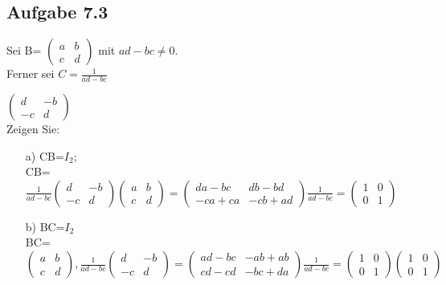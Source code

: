 \documentclass{standalone}
\begin{document}
\subsection{Aufgabe 7.3}


Sei B= $\begin{pmatrix}
	 a & b \\
	  c & d 
	\end{pmatrix}$ mit $ad-bc \neq 0$.\\
Ferner sei $C=\frac{1}{ad-bc}$

$\begin{pmatrix}
	d &-b \\
	-c & d 
\end{pmatrix}$\\ 
 Zeigen Sie: \\
\begin{itemize}
	
	\item[a)]
   CB=$I_2$;\\
   CB=$\frac{1}{ad-bc}
	\begin{pmatrix}
		d & -b \\
		-c & d 
	\end{pmatrix}
	\begin{pmatrix}
		a & b \\
		c & d 
	\end{pmatrix}=
	\begin{pmatrix}
		da-bc & db-bd \\
		-ca+ca & -cb+ad 
	\end{pmatrix}
	\frac{1}{ad-bc}=
	\begin{pmatrix}
		1 & 0 \\
		0 & 1 
	\end{pmatrix}$
	
	\item[b)]
   BC=$I_2$\\
   BC=
	$\begin{pmatrix}
		a & b \\
		c & d 
	\end{pmatrix},
	\frac{1}{ad-bc}
	\begin{pmatrix}
		d & -b \\
		-c & d
	\end{pmatrix}=
	\begin{pmatrix}
		ad-bc & -ab+ab \\
		cd-cd & -bc+da 
	\end{pmatrix}
	\frac{1}{ad-bc}=
	\begin{pmatrix}
		1 & 0 \\ 0 & 1 
	\end{pmatrix} 
	\begin{pmatrix}
		1 & 0 \\
		0 & 1 
	\end{pmatrix}$
	
\end{itemize}
\end{document}
